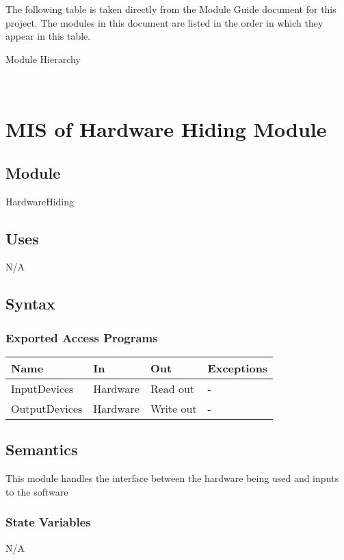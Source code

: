 \documentclass[12pt, titlepage]{article}
\begin{document}
The following table is taken directly from the Module Guide document for this project. The modules in this document are listed in the order in which they appear in this table.

\begin{table}[h!]
\centering

\caption{Module Hierarchy}
\label{TblMH}
\end{table}

\newpage
~\newpage

\section{MIS of Hardware Hiding Module} \label{Mod:HH}

\subsection{Module}
HardwareHiding

\subsection{Uses}
N/A

\subsection{Syntax}

\subsubsection{Exported Access Programs}

\begin{center}
\begin{tabular}{p{3cm} p{4cm} p{4cm} p{2cm}}
\hline
\textbf{Name} & \textbf{In} & \textbf{Out} & \textbf{Exceptions} \\
\hline
InputDevices & Hardware & Read out & - \\
OutputDevices & Hardware & Write out & - \\
\hline
\end{tabular}
\end{center}

\subsection{Semantics}
This module handles the interface between the hardware being used and inputs to the software

\subsubsection{State Variables}
N/A
\end{document}

